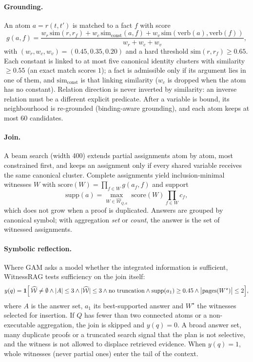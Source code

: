 \paragraph{Grounding.}
An atom $a=r(t,t')$ is matched to a fact $f$ with score
\begin{equation}
  g(a,f)=\frac{w_r\,\mathrm{sim}(r,r_f)+w_c\,\mathrm{sim}_{\text{const}}(a,f)
  +w_v\,\mathrm{sim}(\mathrm{verb}(a),\mathrm{verb}(f))}{w_r+w_c+w_v},
  \label{eq:grounding}
\end{equation}
with $(w_r,w_c,w_v)=(0.45,0.35,0.20)$ and a hard threshold
$\mathrm{sim}(r,r_f)\ge0.65$. Each constant is linked to at most five
canonical identity clusters with similarity $\ge0.55$ (an exact match scores
$1$); a fact is admissible only if its argument lies in one of them, and
$\mathrm{sim}_{\text{const}}$ is that linking similarity ($w_c$ is dropped when
the atom has no constant). Relation direction is never inverted by
similarity: an inverse relation must be a different explicit predicate. After
a variable is bound, its neighbourhood is re-grounded (binding-aware
grounding), and each atom keeps at most 60 candidates.

\paragraph{Join.}
A beam search (width 400) extends partial assignments atom by atom, most
constrained first, and keeps an assignment only if every shared variable
receives the same canonical cluster. Complete assignments yield
inclusion-minimal witnesses $W$ with
$\mathrm{score}(W)=\prod_{f\in W}g(a_f,f)$ and support
\begin{equation}
  \mathrm{supp}(a)=\max_{W\in\widehat{\mathcal{W}}_{Q,a}}\;
  \mathrm{score}(W)\prod_{f\in W}c_f,
  \label{eq:support}
\end{equation}
which does not grow when a proof is duplicated. Answers are grouped by
canonical symbol; with aggregation \emph{set} or \emph{count}, the answer is
the set of witnessed assignments.

\paragraph{Symbolic reflection.}
Where GAM asks a model whether the integrated information is sufficient,
WitnessRAG tests sufficiency on the join itself:
\begin{equation}
  y(q)=\mathbf{1}\Bigl[\,\widehat{\mathcal{W}}\neq\emptyset
  \wedge |A|\le 3 \wedge |\widehat{\mathcal{W}}|\le 3
  \wedge \text{no truncation}
  \wedge \mathrm{supp}(a_1)\ge 0.45
  \wedge \bigl|\mathrm{pages}(W^\star)\bigr|\le 2\Bigr],
  \label{eq:reflection}
\end{equation}
where $A$ is the answer set, $a_1$ its best-supported answer and $W^\star$
the witnesses selected for insertion. If $Q$ has fewer than two connected atoms
or a non-executable aggregation, the join is skipped and $y(q)=0$. A broad
answer set, many duplicate proofs or a truncated search signal that the plan
is not selective, and the witness is not allowed to displace retrieved
evidence. When $y(q)=1$, whole witnesses (never partial ones) enter the tail
of the context.

